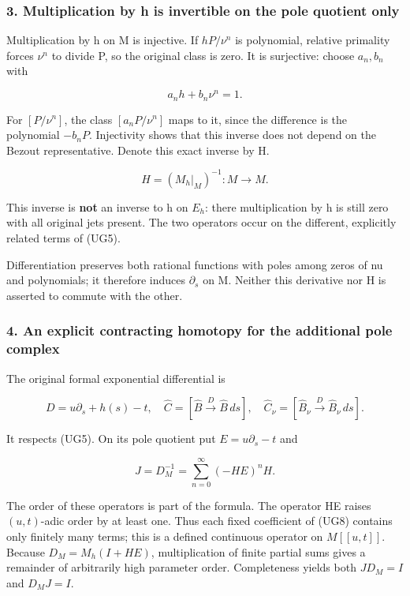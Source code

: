 \documentclass{article}
\begin{document}
\subsubsection{3. Multiplication by h is invertible on the pole quotient only}\label{endpoint-f1_unit_gauge--multiplication-by-h-is-invertible-on-the-pole-quotient-only}

Multiplication by h on M is injective. If \(hP/\nu^n\) is polynomial, relative primality forces \(\nu^n\) to divide P, so the original class is zero. It is surjective: choose \(a_n,b_n\) with

\[
a_n h+b_n\nu^n=1.
\]

For \([P/\nu^n]\), the class \([a_n P/\nu^n]\) maps to it, since the difference is the polynomial \(-b_n P\). Injectivity shows that this inverse does not depend on the Bezout representative. Denote this exact inverse by H.

\[
H=(M_h|_M)^{-1}:M\longrightarrow M.
\tag{UG6}
\]

This inverse is \textbf{not} an inverse to h on \(E_h\): there multiplication by h is still zero with all original jets present. The two operators occur on the different, explicitly related terms of (UG5).

Differentiation preserves both rational functions with poles among zeros of nu and polynomials; it therefore induces \(\partial_s\) on M. Neither this derivative nor H is asserted to commute with the other.

\subsubsection{4. An explicit contracting homotopy for the additional pole complex}\label{endpoint-f1_unit_gauge--an-explicit-contracting-homotopy-for-the-additional-pole-complex}

The original formal exponential differential is

\[
D=u\partial_s+h(s)-t,
\quad\widehat C=[\widehat B\xrightarrow D\widehat B\,ds],
\quad\widehat C_\nu=[\widehat B_\nu\xrightarrow D\widehat B_\nu\,ds].
\tag{UG7}
\]

It respects (UG5). On its pole quotient put \(E=u\partial_s-t\) and

\[
\boxed{J=D_M^{-1}=\sum_{n=0}^\infty(-HE)^nH.}
\tag{UG8}
\]

The order of these operators is part of the formula. The operator HE raises \((u,t)\)-adic order by at least one. Thus each fixed coefficient of (UG8) contains only finitely many terms; this is a defined continuous operator on \(M[[u,t]]\). Because \(D_M=M_h(I+HE)\), multiplication of finite partial sums gives a remainder of arbitrarily high parameter order. Completeness yields both \(J D_M=I\) and \(D_M J=I\).
\end{document}
